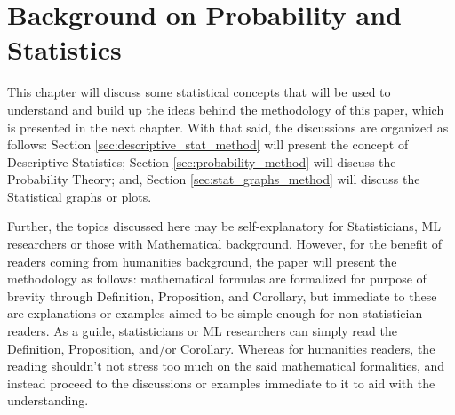 \chapter{Background on Probability and Statistics}
This chapter will discuss some statistical concepts that will be used to understand and build up the ideas behind the methodology of this paper, which is presented in the next chapter. With that said, the discussions are organized as follows: Section \ref{sec:descriptive_stat_method} will present the concept of Descriptive Statistics; Section \ref{sec:probability_method} will discuss the Probability Theory; and, Section \ref{sec:stat_graphs_method} will discuss the Statistical graphs or plots.

Further, the topics discussed here may be self-explanatory for Statisticians, ML researchers or those with Mathematical background. However, for the benefit of readers coming from humanities background, the paper will present the methodology as follows: mathematical formulas are formalized for purpose of brevity through Definition, Proposition, and Corollary, but immediate to these are explanations or examples aimed to be simple enough for non-statistician readers. As a guide, statisticians or ML researchers can simply read the Definition, Proposition, and/or Corollary. Whereas for humanities readers, the reading shouldn't not stress too much on the said mathematical formalities, and instead proceed to the discussions or examples immediate to it to aid with the understanding.
